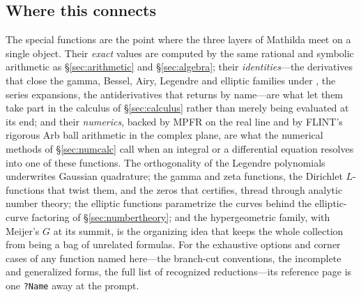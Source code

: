 
\subsection*{Where this connects}

The special functions are the point where the three layers of Mathilda meet on a
single object. Their \emph{exact} values are computed by the same rational and
symbolic arithmetic as \S\ref{sec:arithmetic} and \S\ref{sec:algebra}; their
\emph{identities}---the derivatives that close the gamma, Bessel, Airy, Legendre and
elliptic families under , the series expansions, the antiderivatives that
 returns by name---are what let them take part in the calculus of
\S\ref{sec:calculus} rather than merely being evaluated at its end; and their
\emph{numerics}, backed by MPFR on the real line and by FLINT's rigorous Arb ball
arithmetic in the complex plane, are what the numerical methods of
\S\ref{sec:numcalc} call when an integral or a differential equation resolves into
one of these functions. The orthogonality of the Legendre polynomials underwrites
Gaussian quadrature; the gamma and zeta functions, the Dirichlet
\(L\)-functions that twist them, and the zeros that  certifies, thread
through analytic number theory; the elliptic functions parametrize the curves behind the
elliptic-curve factoring of \S\ref{sec:numbertheory}; and the
hypergeometric family, with Meijer's \(G\) at its summit, is the organizing idea that keeps the whole
collection from being a bag of unrelated formulas. For the exhaustive options and
corner cases of any function named here---the branch-cut conventions, the incomplete
and generalized forms, the full list of recognized reductions---its reference page
is one \texttt{?Name} away at the prompt.
